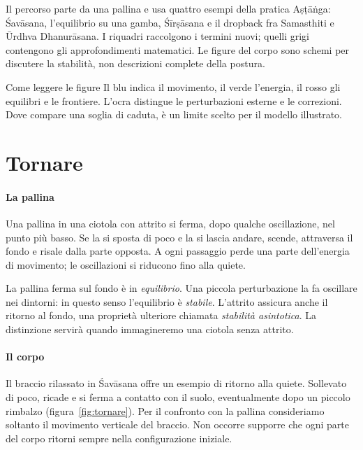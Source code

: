 \documentclass[11pt,a4paper,twoside=false,headinclude,footinclude]{scrartcl}
\begin{document}
Il percorso parte da una pallina e usa quattro esempi della pratica Aṣṭāṅga: Śavāsana, l'equilibrio su una gamba, Śīrṣāsana e il dropback fra Samasthiti e Ūrdhva Dhanurāsana. I riquadri raccolgono i termini nuovi; quelli grigi contengono gli approfondimenti matematici. Le figure del corpo sono schemi per discutere la stabilità, non descrizioni complete della postura.

\begin{riquadro}{Come leggere le figure}
Il blu indica il movimento, il verde l'energia, il rosso gli equilibri e le frontiere. L'ocra distingue le perturbazioni esterne e le correzioni. Dove compare una soglia di caduta, è un limite scelto per il modello illustrato.
\end{riquadro}

\section{Tornare}\label{sec:tornare}

\paragraph{La pallina} Una pallina in una ciotola con attrito si ferma, dopo qualche oscillazione, nel punto più basso. Se la si sposta di poco e la si lascia andare, scende, attraversa il fondo e risale dalla parte opposta. A ogni passaggio perde una parte dell'energia di movimento; le oscillazioni si riducono fino alla quiete.

La pallina ferma sul fondo è in \emph{equilibrio}. Una piccola perturbazione la fa oscillare nei dintorni: in questo senso l'equilibrio è \emph{stabile}. L'attrito assicura anche il ritorno al fondo, una proprietà ulteriore chiamata \emph{stabilità asintotica}. La distinzione servirà quando immagineremo una ciotola senza attrito.

\paragraph{Il corpo} Il braccio rilassato in Śavāsana offre un esempio di ritorno alla quiete. Sollevato di poco, ricade e si ferma a contatto con il suolo, eventualmente dopo un piccolo rimbalzo (figura~\ref{fig:tornare}). Per il confronto con la pallina consideriamo soltanto il movimento verticale del braccio. Non occorre supporre che ogni parte del corpo ritorni sempre nella configurazione iniziale.
\end{document}
